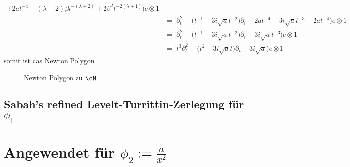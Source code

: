 \begin{try}
\begin{align*}
   + 2at^{-4} - (\lambda+2)\beta t^{-(\lambda+2)}
   + 2 \beta^2 t^{-2(\lambda+1)}\Big) e\otimes 1
\\&= \Big(\partial_t^2 - \big(t^{-1} - 3i\sqrt{a}
    t^{-2}\big)\partial_t
   + 2at^{-4} - 3i\sqrt{a} t^{-3}
   - 2a t^{-4}\Big) e\otimes 1
\\&= \Big(\partial_t^2 - \big(t^{-1} - 3i\sqrt{a} t^{-2}\big)\partial_t
   - 3i\sqrt{a} t^{-3} \Big) e\otimes 1
\\&= \Big(t^3\partial_t^2 - \big(t^{2} - 3i\sqrt{a} t\big)\partial_t
   - 3i\sqrt{a} \Big) e\otimes 1
\end{align*}
somit ist das Newton Polygon
\begin{figure}[H]
\caption{Newton Polygon zu $\cN$}
\begin{center}
\end{center}
\end{figure}
\end{try}

\subsection{Sabah's refined Levelt-Turrittin-Zerlegung für $\phi_1$}

\iffalse
\section{Angewendet für $\phi_2:=\frac{a}{x^2}$}
\begin{comment}
für $q=2$
%
\begin{align*}
P_{\phi}(x,\partial_x) &=(-x^2\partial_x)^2 (x\partial_x-1)+2a \\
  &=x^2\underbracket{\partial_xx^2}\partial_x(x\partial_x-1)+2a \\
  &=x^2\overbracket{(x^2\partial_x+2x)}\partial_x(x\partial_x-1)+2a \\
  &=(x^4\partial_x^2+2x^3\partial_x)(x\partial_x-1)+2a \\
  &=x^4\underbracket{\partial_x^2x}\partial_x
    +2x^3\underbracket{\partial_xx}\partial_x
    -x^4\partial_x^2-2x^3\partial_x+2a \\
  &=x^4\overbracket{(x\partial_x^2+2x)}\partial_x
    +2x^3\overbracket{(x\partial_x+1)}\partial_x
    -x^4\partial_x^2-2x^3\partial_x+2a \\
  &=x^5\partial_x^3+2x^5\partial_x +2x^4\partial_x^2 +2x^3\partial_x
    -x^4\partial_x^2-2x^3\partial_x+2a \\
  &=3x^5\partial_x^3 +x^4\partial_x^2 + 2a
\end{align*}
\end{comment}

